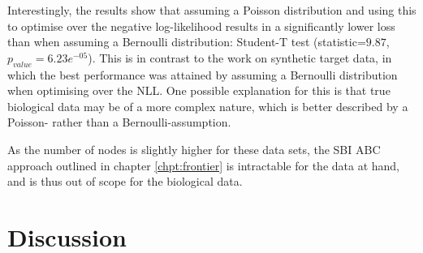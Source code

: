 \documentclass[mphil,deptreport,ianc]{infthesis} %
\begin{document}
Interestingly, the results show that assuming a Poisson distribution and using this to optimise over the negative log-likelihood results in a significantly lower loss than when assuming a Bernoulli distribution: Student-T test (statistic=$9.87$, $p_{value}=6.23e^{-05}$).
This is in contrast to the work on synthetic target data, in which the best performance was attained by assuming a Bernoulli distribution when optimising over the NLL.
One possible explanation for this is that true biological data may be of a more complex nature, which is better described by a Poisson- rather than a Bernoulli-assumption.

 
 
 
 
 
 
 

As the number of nodes is slightly higher for these data sets, the SBI ABC approach outlined in chapter \ref{chpt:frontier} is intractable for the data at hand, and is thus out of scope for the biological data. 


\section{Discussion}
\end{document}
